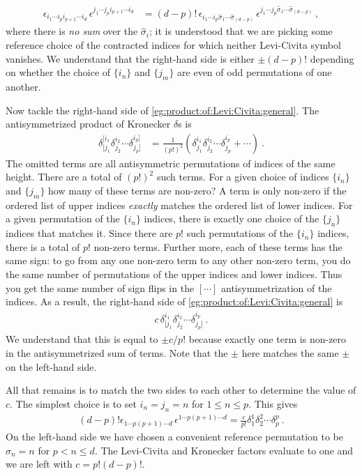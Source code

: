 \documentclass[12pt, oneside]{report}    %
\begin{document}
\begin{subappendices}
\begin{align}
    \epsilon_{i_1\cdots i_p i_{p+1}\cdots i_d}\,
    \epsilon^{j_1\cdots j_p i_{p+1}\cdots i_d}
    &= 
    (d-p)!\,
    \epsilon_{i_1\cdots i_p \hat\sigma_1\cdots \hat\sigma_{(d-p)}}\,
    \epsilon^{j_1\cdots j_p \hat\sigma_1\cdots \hat\sigma_{(d-p)}}
     \ ,
\end{align}
where there is \emph{no sum} over the $\hat\sigma_i$; it is understood that we are picking some reference choice of the contracted indices for which neither Levi-Civita symbol vanishes. We understand that the right-hand side is either $\pm (d-p)!$ depending on whether the choice of $\{i_n\}$ and $\{j_m\}$ are even of odd permutations of one another. 

Now tackle the right-hand side of \eqref{eg:product:of:Levi:Civita:general}. The antisymmetrized product of Kronecker $\delta$s is
\begin{align}
    \delta^{[i_1}_{[j_1}\delta^{i_2}_{j_2} \cdots \delta^{i_p]}_{j_p]}
    &=
    \frac{1}{(p!)^2}
    \left( 
    \delta^{i_1}_{j_1}\delta^{i_2}_{j_2} \cdots \delta^{i_p}_{j_p}
    + \cdots
    \right) \ .
\end{align}
The omitted terms are all antisymmetric permutations of indices of the same height. There are a total of $(p!)^2$ such terms.  For a given choice of indices $\{i_n\}$ and $\{j_m\}$ how many of these terms are non-zero? A term is only non-zero if the ordered list of upper indices \emph{exactly} matches the ordered list of lower indices. For a given permutation of the $\{i_n\}$ indices, there is exactly one choice of the $\{j_n\}$ indices that matches it. Since there are $p!$ such permutations of the $\{i_n\}$ indices, there is a total of $p!$ non-zero terms. Further more, each of these terms has the same sign: to go from any one non-zero term to any other non-zero term, you do the same number of permutations of the upper indices and lower indices. Thus you get the same number of sign flips in the $[\cdots]$ antisymmetrization of the indices. As a result, the right-hand side of \eqref{eg:product:of:Levi:Civita:general} is
\begin{align}
    c\,
    \delta^{i_1}_{[j_1}\delta^{i_2}_{j_2} \cdots \delta^{i_p}_{j_p]} \ .
\end{align}
We understand that this is equal to $\pm c/p!$ because exactly one term is non-zero in the antisymmetrized sum of terms. Note that the $\pm$ here matches the same $\pm$ on the left-hand side.

All that remains is to match the two sides to each other to determine the value of $c$. The simplest choice is to set $i_n = j_n = n$ for $1\leq n \leq p$. This gives
\begin{align}
    (d-p)!
    \epsilon_{1\cdots p (p+1)\cdots d}\,
    \epsilon^{1\cdots p (p+1)\cdots d}
    =
    \frac{c}{p!}
    \delta^{1}_{1}\delta^{2}_{2} \cdots \delta^{p}_{p} \ .
\end{align}
On the left-hand side we have chosen a convenient reference permutation to be $\hat \sigma_n = n$ for $p < n \leq d$. The Levi-Civita and Kronecker factors evaluate to one and we are left with $c= p! (d-p)!$. 





\end{subappendices}
\end{document}
